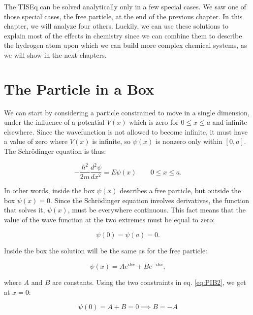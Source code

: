 \documentclass[
  english,
  9pt,
]{extbook}
\theoremstyle{definition}
\theoremstyle{definition}
\theoremstyle{definition}
\theoremstyle{definition}
\theoremstyle{remark}
\begin{document}
The TISEq can be solved analytically only in a few special cases. We saw one of those special cases, the free particle, at the end of the previous chapter. In this chapter, we will analyze four others. Luckily, we can use these solutions to explain most of the effects in chemistry since we can combine them to describe the hydrogen atom upon which we can build more complex chemical systems, as we will show in the next chapters.

\section{The Particle in a Box}\label{the-particle-in-a-box}

We can start by considering a particle constrained to move in a single dimension, under the influence of a potential \(V(x)\) which is zero for \(0 \leq x \leq a\) and infinite elsewhere. Since the wavefunction is not allowed to become infinite, it must have a value of zero where \(V(x)\) is infinite, so \(\psi(x)\) is nonzero only within \([0,a]\). The Schrödinger equation is thus:

\begin{equation}
- \frac{\hbar^2}{2m} \frac{d^2\psi}{dx^2} = E \psi(x)
\qquad 0 \leq x \leq a.
\label{eq:PIB1}
\end{equation}

In other words, inside the box \(\psi(x)\) describes a free particle, but outside the box \(\psi(x)=0\). Since the Schrödinger equation involves derivatives, the function that solves it, \(\psi(x)\), must be everywhere continuous. This fact means that the value of the wave function at the two extremes must be equal to zero:

\begin{equation}
\psi(0)=\psi(a)=0.
\label{eq:PIB2}
\end{equation}

Inside the box the solution will be the same as for the free particle:

\begin{equation}
\psi(x) = A e^{ikx} + B e^{-ikx},
\label{eq:PIB3}
\end{equation}

where \(A\) and \(B\) are constants. Using the two constraints in eq. \eqref{eq:PIB2}, we get at \(x=0\):

\begin{equation}
\psi(0) = A + B = 0 \implies B = -A
\label{eq:PIB4}
\end{equation}
\end{document}
